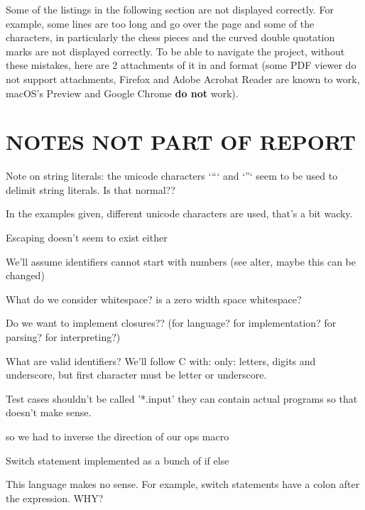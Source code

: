 \documentclass{article}
\begin{document}
Some of the listings in the following section are not displayed correctly. For
example, some lines are too long and go over the page and some of the
characters, in particularly the chess pieces and the curved double quotation
marks are not displayed correctly. To be able to navigate the project, without
these mistakes, here are 2 attachments of it in
 and
 format (some PDF viewer do not
support attachments, Firefox and Adobe Acrobat Reader are known to work,
macOS's Preview and Google Chrome \textbf{do not} work).



\section{NOTES NOT PART OF REPORT}

Note on string literals: the unicode characters `“` and `”` seem to be used to
delimit string literals. Is that normal??

In the examples given, different unicode characters are used, that's a bit
wacky.

Escaping doesn't seem to exist either

We'll assume identifiers cannot start with numbers (see alter, maybe this can
be changed)

What do we consider whitespace? is a zero width space whitespace?

Do we want to implement closures?? (for language? for implementation? for parsing? for interpreting?)

What are valid identifiers? We'll follow C with: only: letters, digits and
underscore, but first character must be letter or underscore.

Test cases shouldn't be called '*.input' they can contain actual programs so
that doesn't make sense.


so we had to inverse the direction of our ops macro


Switch statement implemented as a bunch of if else

This language makes no sense. For example, switch statements have a colon after
the expression. WHY?
\end{document}
